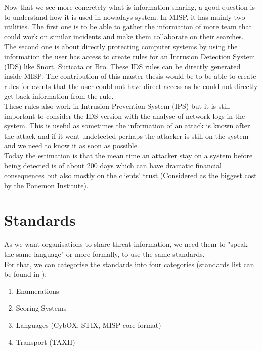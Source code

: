 \documentclass{eplmastersthesis}
\begin{document}
Now that we see more concretely what is information sharing, a good question is to understand how it is used in nowadays system. In MISP, it has mainly two utilities. The first one is to be able to gather the information of more team that could work on similar incidents and make them collaborate on their searches.\\
The second one is about directly protecting computer systems by using the information the user has access to create rules for an Intrusion Detection System (IDS) like Snort, Suricata or Bro. These IDS rules can be directly generated inside MISP. The contribution of this master thesis would be to be able to create rules for events that the user could not have direct access as he could not directly get back information from the rule.\\
These rules also work in Intrusion Prevention System (IPS) but it is still important to consider the IDS version with the analyse of network logs in the system. This is useful as sometimes the information of an attack is known after the attack and if it went undetected perhaps the attacker is still on the system and we need to know it as soon as possible.\\
Today the estimation is that the mean time an attacker stay on a system before being detected is of about 200 days which can have dramatic financial consequences but also mostly on the clients' trust (Considered as the biggest cost by the Ponemon Institute).



\section{Standards}
As we want organisations to share threat information, we need them to "speak the same language" or more formally, to use the same standards.\\
For that, we can categorise the standards into four categories (standards list can be found in \cite{AwesomeTreat, mohaisen2017rethinking}):
\begin{enumerate}
\item Enumerations
\item Scoring Systems
\item Languages (CybOX, STIX, MISP-core format)
\item Transport (TAXII)
\end{enumerate}
\end{document}
